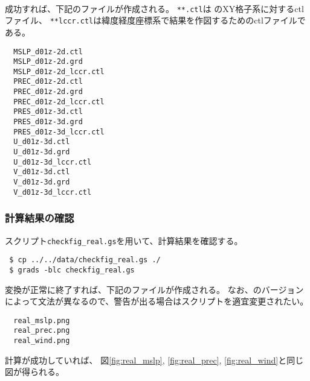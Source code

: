 \\

成功すれば、下記のファイルが作成される。
\verb|**.ctl|は {\scalerm} のXY格子系に対するctlファイル、
\verb|**lccr.ctl|は緯度経度座標系で結果を作図するためのctlファイルである。

\begin{verbatim}
  MSLP_d01z-2d.ctl
  MSLP_d01z-2d.grd
  MSLP_d01z-2d_lccr.ctl
  PREC_d01z-2d.ctl
  PREC_d01z-2d.grd
  PREC_d01z-2d_lccr.ctl
  PRES_d01z-3d.ctl
  PRES_d01z-3d.grd
  PRES_d01z-3d_lccr.ctl
  U_d01z-3d.ctl
  U_d01z-3d.grd
  U_d01z-3d_lccr.ctl
  V_d01z-3d.ctl
  V_d01z-3d.grd
  V_d01z-3d_lccr.ctl
\end{verbatim}




\subsubsection{計算結果の確認}


\grads スクリプト\verb|checkfig_real.gs|を用いて、計算結果を確認する。
\begin{verbatim}
 $ cp ../../data/checkfig_real.gs ./
 $ grads -blc checkfig_real.gs
\end{verbatim}
変換が正常に終了すれば、下記のファイルが作成される。
なお、\grads のバージョンによって文法が異なるので、警告が出る場合はスクリプトを適宜変更されたい。
\begin{verbatim}
  real_mslp.png
  real_prec.png
  real_wind.png
\end{verbatim}
計算が成功していれば、
図\ref{fig:real_mslp}, \ref{fig:real_prec}, \ref{fig:real_wind}と同じ図が得られる。


